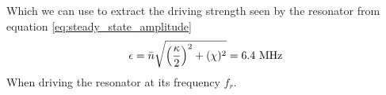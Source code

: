 Which we can use to extract the driving strength seen by the resonator from equation \ref{eq:steady_state_amplitude}
\begin{equation}
    \epsilon = \Bar{n} \sqrt{\left(\frac{\kappa}{2}\right)^2 + (\chi)^2} = 6.4 \text{ MHz}
\end{equation}
When driving the resonator at its frequency $f_r$.












